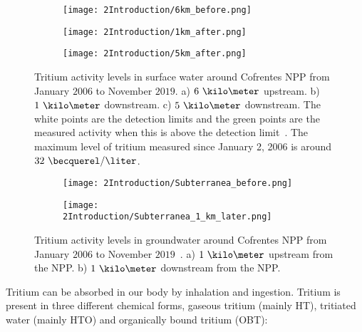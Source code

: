 \begin{figure}
\centering
    \begin{subfigure}[b]{0.7\textwidth}
    \centering
    \texttt{[image: 2Introduction/6km\_before.png]}  
    \caption{\label{subfig:TritiumL6kB}}
    \end{subfigure}
    \hfill
    \begin{subfigure}[b]{0.7\textwidth}
    \centering
    \texttt{[image: 2Introduction/1km\_after.png]}  
    \caption{\label{subfig:TritiumL1kA}}
    \end{subfigure}
    \hfill
    \begin{subfigure}[b]{0.7\textwidth}
    \centering
    \texttt{[image: 2Introduction/5km\_after.png]}  
    \caption{\label{subfig:TritiumL5kA}}
    \end{subfigure}
 \caption{Tritium activity levels in surface water around Cofrentes NPP from January $2006$ to November $2019$. a) $6~\kilo\meter$ upstream. b) $1~\kilo\meter$ downstream. c) $5~\kilo\meter$ downstream. The white points are the detection limits and the green points are the measured activity when this is above the detection limit~\cite{REM}. The maximum level of tritium measured since January 2, 2006 is around $32~\becquerel/\liter$.}
 \label{subfig:MeasurementsCofrentesSurface}
\end{figure}

\begin{figure}
\centering
    \begin{subfigure}[b]{0.7\textwidth}
    \centering
    \texttt{[image: 2Introduction/Subterranea\_before.png]}  
    \caption{\label{subfig:TritiumLG1kB}}
    \end{subfigure}
    \hfill
    \begin{subfigure}[b]{0.7\textwidth}
    \centering
    \texttt{[image: 2Introduction/Subterranea\_1\_km\_later.png]}  
    \caption{\label{subfig:TritiumLG1kA}}
    \end{subfigure}
 \caption{Tritium activity levels in groundwater around Cofrentes NPP from January $2006$ to November $2019$~\cite{REM}. a) $1~\kilo\meter$ upstream from the NPP. b) $1~\kilo\meter$ downstream from the NPP.}
 \label{fig:MeasurementsCofrentesGroundWater}
\end{figure}

Tritium can be absorbed in our body by inhalation and ingestion. Tritium is present in three different chemical forms, gaseous tritium (mainly HT), tritiated water (mainly HTO) and organically bound tritium (OBT):

